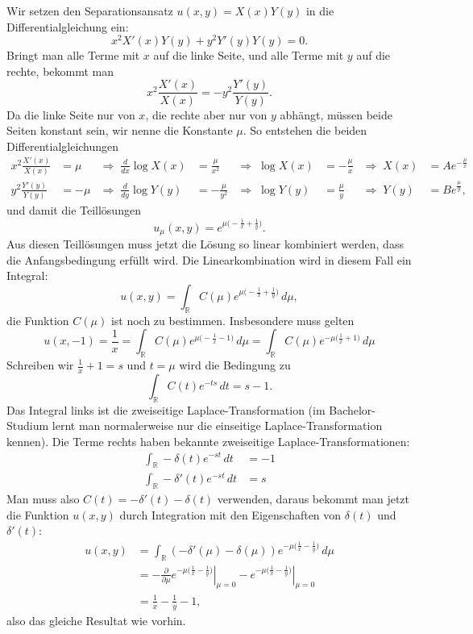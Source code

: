 \begin{loesung}
Wir setzen den Separationsansatz $u(x,y)=X(x)Y(y)$ in die
Differentialgleichung ein:
\[
x^2X'(x)Y(y)+y^2Y'(y)Y(y)=0.
\]
Bringt man alle Terme mit $x$ auf die linke Seite, und alle Terme
mit $y$ auf die rechte, bekommt man
\[
x^2\frac{X'(x)}{X(x)}=- y^2\frac{Y'(y)}{Y(y)}.
\]
Da die linke Seite nur von $x$, die rechte aber nur von $y$ abhängt,
müssen beide Seiten konstant sein, wir nenne die Konstante $\mu$.
So entstehen die beiden Differentialgleichungen
\begin{align*}
x^2\frac{X'(x)}{X(x)}&=\mu
&
\Rightarrow\;
\frac{d}{dx}\log X(x)&=\frac{\mu}{x^2}
&
\Rightarrow\;
\log X(x)&=-\frac{\mu}{x}
&
\Rightarrow\;
X(x)&=Ae^{-\frac{\mu}{x}}
\\
y^2\frac{Y'(y)}{Y(y)}&=-\mu
&
\Rightarrow\;
\frac{d}{dy}\log Y(y)&=-\frac{\mu}{y^2}
&
\Rightarrow\;
\log Y(y)&=\frac{\mu}{y}
&
\Rightarrow\;
Y(y)&=Be^{\frac{\mu}{y}},
\end{align*}
und damit die Teillösungen
\[
u_\mu(x,y)=e^{\mu\bigl(-\frac1x+\frac1y\bigr)}.
\]
Aus diesen Teillösungen muss jetzt die Lösung so linear kombiniert
werden, dass die Anfangsbedingung erfüllt wird. Die Linearkombination
wird in diesem Fall ein Integral:
\[
u(x,y)=\int_{\mathbb R}C(\mu)
e^{\mu\bigl(-\frac1x+\frac1y\bigr)}\,d\mu,
\]
die Funktion $C(\mu)$ ist noch zu bestimmen.
Insbesondere muss gelten
\[
u(x,-1)
=
\frac1x
=
\int_{\mathbb R}C(\mu)e^{\mu\bigl(-\frac1x-1)}\,d\mu
=
\int_{\mathbb R}C(\mu)e^{-\mu\bigl(\frac1x+1)}\,d\mu
\]
Schreiben wir $\frac1x+1=s$ und $t=\mu$ wird die Bedingung
zu
\[
\int_{\mathbb R}C(t)e^{-ts}\,dt=s-1.
\]
Das Integral links ist die zweiseitige Laplace-Transformation
(im Bachelor-Studium lernt man normalerweise nur die einseitige
Laplace-Transformation kennen). Die Terme rechts haben bekannte
zweiseitige Laplace-Transformationen:
\begin{align*}
\int_{\mathbb R}-\delta(t)e^{-st}\,dt&=-1\\
\int_{\mathbb R}-\delta'(t)e^{-st}\,dt&=s
\end{align*}
Man muss also $C(t)=-\delta'(t)-\delta(t)$ verwenden, daraus bekommt
man jetzt die Funktion $u(x,y)$ durch Integration mit den Eigenschaften
von $\delta(t)$ und $\delta'(t)$:
\begin{align*}
u(x,y)
&=
\int_{\mathbb R}
(-\delta'(\mu)-\delta(\mu))
e^{-\mu\bigl(\frac1x-\frac1y\bigr)}\,d\mu
\\
&=
-\left.\frac{\partial}{\partial \mu}
e^{-\mu\bigl(\frac1x-\frac1y\bigr)}\right|_{\mu=0}
-
\left.e^{-\mu\bigl(\frac1x-\frac1y\bigr)}\right|_{\mu=0}
\\
&=
\frac1x-\frac1y-1,
\end{align*}
also das gleiche Resultat wie vorhin.
\end{loesung}
